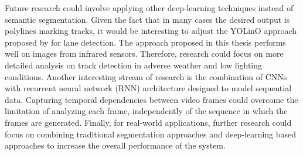 \documentclass[Master,MDS,english]{BASE/twbook} %
\begin{document}
Future research could involve applying other deep-learning techniques instead of semantic segmentation. Given the fact that in many cases the desired output is polylines marking tracks, it would be interesting to adjust the YOLinO approach proposed by \cite{meyer2021yolino} for lane detection. %
The approach proposed in this thesis performs well on images from infrared sensors. Therefore, research could focus on more detailed analysis on track detection in adverse weather and low lighting conditions. Another interesting stream of research is the combination of CNNs with recurrent neural network (RNN) architecture designed to model sequential data. Capturing temporal dependencies between video frames  could overcome the limitation of analyzing each frame, independently of the sequence in which the frames are generated. Finally, for real-world applications, further research could focus on combining traditional segmentation approaches and deep-learning based approaches to increase the overall performance of the system.










\clearpage                                                       %


\clearpage

\listoffigures                                                   %
\clearpage

\listoftables                                                    %
\clearpage

    
\end{document}
